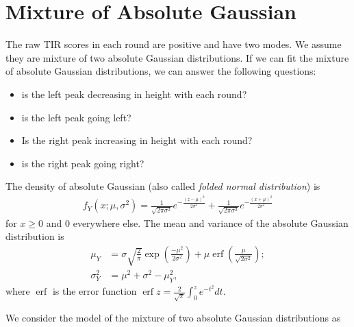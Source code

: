 \newpage

\section{Mixture of Absolute Gaussian}

The raw TIR scores in each round are positive and  have two modes. 
We assume they are mixture of two absolute Gaussian distributions. 
If we can fit the mixture of absolute Gaussian distributions, we can answer the following questions:
\begin{itemize}
    \item is the left peak decreasing in height with each round?
	\item is the left peak going left?
	\item Is the right peak increasing in height with each round?
	\item is the right peak going right?
\end{itemize}

The density of absolute Gaussian (also called \textit{folded normal distribution}) is 
\begin{align}
    f_{Y}\left(x ; \mu, \sigma^{2}\right)=\frac{1}{\sqrt{2 \pi \sigma^{2}}} e^{-\frac{(z-\mu)^{2}}{2 \sigma^{2}}}+\frac{1}{\sqrt{2 \pi \sigma^{2}}} e^{-\frac{(x+\mu)^{2}}{2 \sigma^{2}}}
\end{align}
for $x \geq 0$ and $0$ everywhere else. 
The mean and variance of the absolute Gaussian distribution is 
\begin{align}
    \mu_{Y} &=\sigma \sqrt{\frac{2}{\pi}} \exp \left(\frac{-\mu^{2}}{2 \sigma^{2}}\right)+\mu \operatorname{erf}\left(\frac{\mu}{\sqrt{2 \sigma^{2}}}\right);\\
    \sigma_{Y}^{2} &=\mu^{2}+\sigma^{2}-\mu_{Y}^{2},
\end{align}
where $\operatorname{erf}$ is the error function 
$\operatorname{erf} z=\frac{2}{\sqrt{\pi}} \int_{0}^{z} e^{-t^{2}} d t$.

We consider the model of the mixture of two absolute Gaussian distributions as 